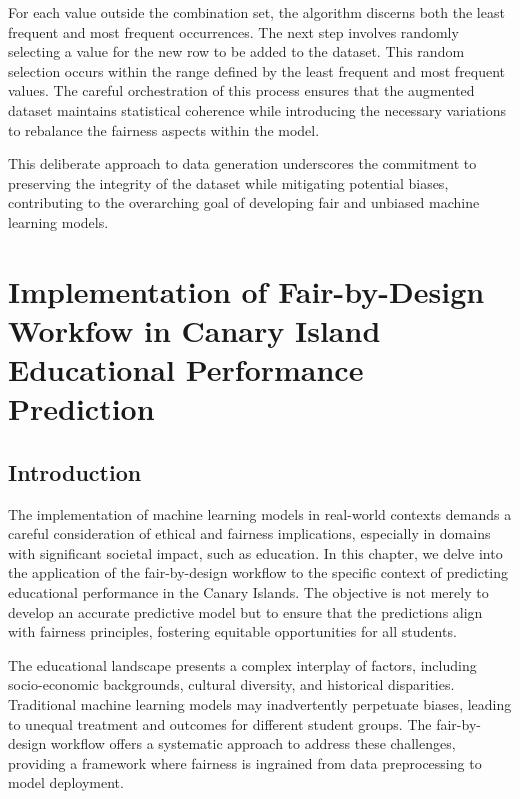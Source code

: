 \documentclass[12pt,a4paper,openright,twoside]{book}
\begin{document}
For each value outside the combination set, the algorithm discerns both the least frequent and most frequent occurrences. The next step involves randomly selecting a value for the new row to be added to the dataset. This random selection occurs within the range defined by the least frequent and most frequent values. The careful orchestration of this process ensures that the augmented dataset maintains statistical coherence while introducing the necessary variations to rebalance the fairness aspects within the model.

This deliberate approach to data generation underscores the commitment to preserving the integrity of the dataset while mitigating potential biases, contributing to the overarching goal of developing fair and unbiased machine learning models.


\chapter{Implementation of Fair-by-Design Workfow in Canary Island Educational Performance Prediction}
\label{chap:real-world-scenario}

\section{Introduction}

The implementation of machine learning models in real-world contexts demands a careful consideration of ethical and fairness implications, especially in domains with significant societal impact, such as education. In this chapter, we delve into the application of the fair-by-design workflow to the specific context of predicting educational performance in the Canary Islands. The objective is not merely to develop an accurate predictive model but to ensure that the predictions align with fairness principles, fostering equitable opportunities for all students.

The educational landscape presents a complex interplay of factors, including socio-economic backgrounds, cultural diversity, and historical disparities. Traditional machine learning models may inadvertently perpetuate biases, leading to unequal treatment and outcomes for different student groups. The fair-by-design workflow offers a systematic approach to address these challenges, providing a framework where fairness is ingrained from data preprocessing to model deployment.
\end{document}
